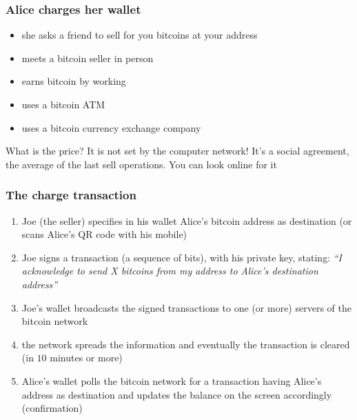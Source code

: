 \documentclass[11pt]{beamer}  %
\begin{document}
\begin{frame}\frametitle{Alice charges her wallet}
  \begin{itemize}
  \item she asks a friend to sell for you bitcoins at your address
  \item meets a bitcoin seller in person
  \item earns bitcoin by working
  \item uses a bitcoin ATM
  \item uses a bitcoin currency exchange company
  \end{itemize}

  \bigskip

  \begin{greenbox}{What is the price?}
    It is not set by the computer network! It's a social
    agreement, the average of the last sell operations.
    You can look online for it
  \end{greenbox}

\end{frame}

\begin{frame}\frametitle{The charge transaction}

  \begin{enumerate}
  \item Joe (the seller) specifies in his wallet Alice's bitcoin address
    as destination (or scans Alice's QR code with his mobile)
  \item Joe signs a transaction (a sequence of bits),
    with his private key, stating: \emph{``I acknowledge
    to send X bitcoins from my address to Alice's destination address''}
  \item Joe's wallet broadcasts the signed transactions
    to one (or more) servers of the bitcoin network
  \item the network spreads the information and eventually the transaction is cleared
    (in $10$ minutes or more)
  \item Alice's wallet polls the bitcoin network for a transaction having
    Alice's address as destination and updates the balance on the screen
    accordingly (\alert{confirmation})
  \end{enumerate}

\end{frame}
\end{document}
